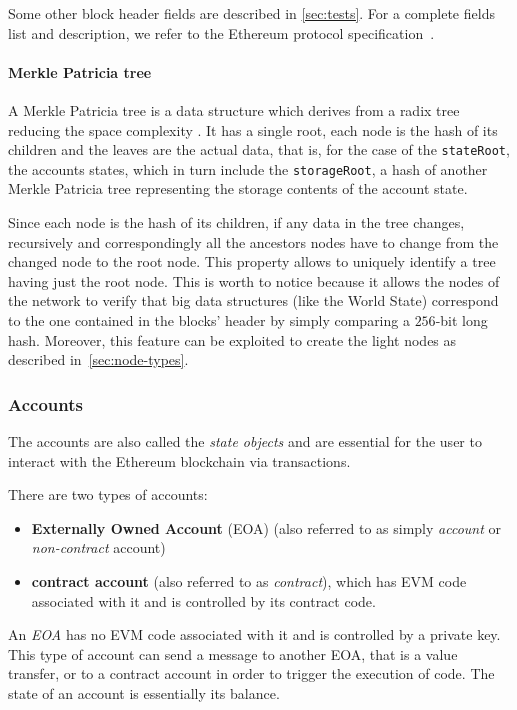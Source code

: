 Some other block header fields are described in \autoref{sec:tests}. For a
complete fields list and description, we refer to the Ethereum protocol
specification~\cite{wood2018ethereum}.

\paragraph{Merkle Patricia tree}
A Merkle Patricia tree is a data structure which derives from a radix tree
reducing the space complexity \cite{patriciatree}. It has a single root, each
node is the hash of its children and the leaves are the actual data, that is,
for the case of the \verb+stateRoot+, the accounts states, which in turn include
the \verb+storageRoot+, a hash of another Merkle Patricia tree representing the
storage contents of the account state.

Since each node is the hash of its children, if any data in the tree changes,
recursively and correspondingly all the ancestors nodes have to change from the
changed node to the root node. This property allows to uniquely identify a tree
having just the root node. This is worth to notice because it allows the nodes
of the network to verify that big data structures (like the World State)
correspond to the one contained in the blocks' header by simply comparing a
$256$-bit long hash. Moreover, this feature can be exploited to create the light
nodes as described in~\autoref{sec:node-types}.


\subsubsection{Accounts}
\label{sec:accounts}

The accounts are also called the \emph{state objects} and are essential for the
user to interact with the Ethereum blockchain via transactions.

There are two types of accounts:

\begin{itemize}
  \item \textbf{Externally Owned Account} (EOA) (also referred to as simply
  \emph{account} or \emph{non-contract} account)
  \item \textbf{contract account} (also referred to as \emph{contract}), which
  has EVM code associated with it and is controlled by its contract code.
\end{itemize}

An \emph{EOA} has no EVM code associated with it and is controlled by a private
key. This type of account can send a message to another EOA, that is a value
transfer, or to a contract account in order to trigger the execution of code.
The state of an account is essentially its balance.


